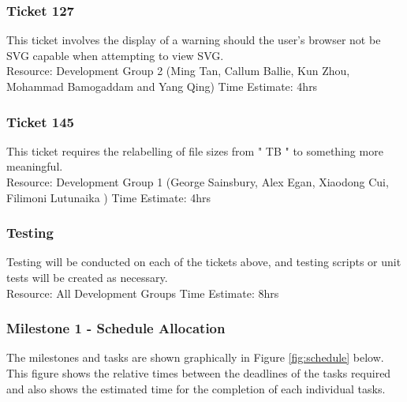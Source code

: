 \documentclass{article}
\begin{document}
\subsubsection{Ticket 127}
	This ticket involves the display of a warning should the user's browser not be SVG capable when attempting to view SVG.\\
	
	Resource: Development Group 2 (Ming Tan, Callum Ballie, Kun Zhou, Mohammad Bamogaddam and Yang Qing)
	Time Estimate: 4hrs

\subsubsection{Ticket 145}
	This ticket requires the relabelling of file sizes from "  TB " to something more meaningful.\\
	
	Resource: Development Group 1 (George Sainsbury, Alex Egan, Xiaodong Cui, Filimoni Lutunaika )
	Time Estimate: 4hrs
	
\subsubsection{Testing}
	Testing will be conducted on each of the tickets above, and testing scripts or unit tests will be created as necessary.\\
	
	Resource: All Development Groups
	Time Estimate: 8hrs

\subsubsection{Milestone 1 - Schedule Allocation}

The milestones and tasks are shown graphically in Figure \ref{fig:schedule} below. This figure shows the relative times between the deadlines of the tasks required and also shows the estimated time for the completion of each individual tasks.\\
\end{document}
